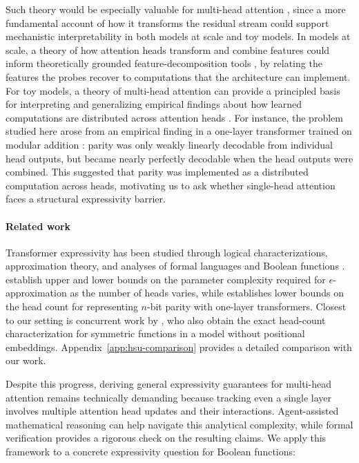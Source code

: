 \documentclass{article}
\theoremstyle{definition}
\theoremstyle{plain}
\begin{document}
Such theory would be especially valuable for multi-head attention \citep{vaswani2017attention}, since a more fundamental account of how it transforms the residual stream could support mechanistic interpretability in both models at scale and toy models.
In models at scale, a theory of how attention heads transform and combine features could inform theoretically grounded feature-decomposition tools \citep{cunningham2023sparseautoencodershighlyinterpretable, shafran2026from}, by relating the features the probes recover to computations that the architecture can implement. 
For toy models, a theory of multi-head attention can provide a principled basis for interpreting and generalizing empirical findings about how learned computations are distributed across attention heads \citep{nanda2023progressmeasuresgrokkingmechanistic, piotrowski2025constrainedbeliefupdatesexplain}. For instance, the problem studied here arose from an empirical finding in a one-layer transformer trained on modular addition \cite{nanda2023progressmeasuresgrokkingmechanistic}: parity was only weakly linearly decodable from individual head outputs, but became nearly perfectly decodable when the head outputs were combined. This suggested that parity was implemented as a distributed computation across heads, motivating us to ask whether single-head attention faces a structural expressivity barrier.

\paragraph{Related work} Transformer expressivity has been studied through logical characterizations, approximation theory, and analyses of formal languages and Boolean functions \citep{weiss2021thinking,yang2024counting,salzer2026counting,kajitsuka2024one,hahn2020theoretical,kozachinskiy2026parity,hsu2026lowerbounds,kover2026geometry}. \citet{yu2026headcount} establish upper and lower bounds on the parameter complexity required for $\epsilon$-approximation as the number of heads varies, while \citet{hsu2026lowerbounds} establishes lower bounds on the head count for representing $n$-bit parity with one-layer transformers. Closest to our setting is concurrent work by \citet{hsu2026attentionbased}, who also obtain the exact head-count characterization for symmetric functions in a model without positional embeddings. Appendix~\ref{app:hsu-comparison} provides a detailed comparison with our work.

Despite this progress, deriving general expressivity guarantees for multi-head attention remains technically demanding because tracking even a single layer involves multiple attention head updates and their interactions. Agent-assisted mathematical reasoning can help navigate this analytical complexity, while formal verification provides a rigorous check on the resulting claims. We apply this framework to a concrete expressivity question for Boolean functions:
\end{document}
